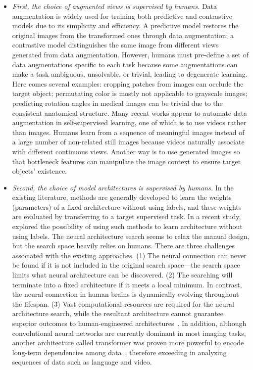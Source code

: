 \begin{itemize}
    \item \textit{First, the choice of augmented views is supervised by humans.} Data augmentation is widely used for training both predictive and contrastive models due to its simplicity and efficiency. A predictive model restores the original images from the transformed ones through data augmentation; a contrastive model distinguishes the same image from different views generated from data augmentation. However, humans must pre-define a set of data augmentations specific to each task because some augmentations can make a task ambiguous, unsolvable, or trivial, leading to degenerate learning. Here comes several examples: cropping patches from images can occlude the target object; permutating color is mostly not applicable to grayscale images; predicting rotation angles in medical images can be trivial due to the consistent anatomical structure. Many recent works appear to automate data augmentation in self-supervised learning, one of which is to use videos rather than images. Humans learn from a sequence of meaningful images instead of a large number of non-related still images because videos naturally associate with different continuous views. Another way is to use generated images so that bottleneck features can manipulate the image context to ensure target objects' existence.
    
    \item \textit{Second, the choice of model architectures is supervised by humans.} In the existing literature, methods are generally developed to learn the weights (parameters) of a ﬁxed architecture without using labels, and these weights are evaluated by transferring to a target supervised task. In a recent study, \citet{liu2020labels} explored the possibility of using such methods to learn architecture without using labels. The neural architecture search seems to relax the manual design, but the search space heavily relies on humans. There are three challenges associated with the existing approaches. (1) The neural connection can never be found if it is not included in the original search space—the search space limits what neural architecture can be discovered. (2) The searching will terminate into a fixed architecture if it meets a local minimum. In contrast, the neural connection in human brains is dynamically evolving throughout the lifespan. (3) Vast computational resources are required for the neural architecture search, while the resultant architecture cannot guarantee superior outcomes to human-engineered architectures~\citep{isensee2021nnu}. In addition, although convolutional neural networks are currently dominant in most imaging tasks, another architecture called transformer was proven more powerful to encode long-term dependencies among data~\citep{vaswani2017attention,dosovitskiy2020image}, therefore exceeding in analyzing sequences of data such as language and video.
    

\end{itemize}
